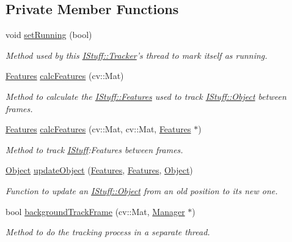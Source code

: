 \subsection*{Private Member Functions}
\begin{DoxyCompactItemize}
\item 
void \hyperlink{class_i_stuff_1_1_tracker_a0f512d1134b48840d65547bc60d2dd7d}{set\-Running} (bool)
\begin{DoxyCompactList}\small\item\em Method used by this \hyperlink{class_i_stuff_1_1_tracker}{I\-Stuff\-::\-Tracker}'s thread to mark itself as running. \end{DoxyCompactList}\item 
\hyperlink{namespace_i_stuff_a2d680b8d3ea1fa53d1aa740cc669063c}{Features} \hyperlink{class_i_stuff_1_1_tracker_ac36102855dfda592ccec02f77a8eaf35}{calc\-Features} (cv\-::\-Mat)
\begin{DoxyCompactList}\small\item\em Method to calculate the \hyperlink{namespace_i_stuff_a2d680b8d3ea1fa53d1aa740cc669063c}{I\-Stuff\-::\-Features} used to track \hyperlink{class_i_stuff_1_1_object}{I\-Stuff\-::\-Object} between frames. \end{DoxyCompactList}\item 
\hyperlink{namespace_i_stuff_a2d680b8d3ea1fa53d1aa740cc669063c}{Features} \hyperlink{class_i_stuff_1_1_tracker_afd3adb1eeef3d7337da0a3c9d9a152d2}{calc\-Features} (cv\-::\-Mat, cv\-::\-Mat, \hyperlink{namespace_i_stuff_a2d680b8d3ea1fa53d1aa740cc669063c}{Features} $\ast$)
\begin{DoxyCompactList}\small\item\em Method to track \hyperlink{namespace_i_stuff}{I\-Stuff}\-:Features between frames. \end{DoxyCompactList}\item 
\hyperlink{class_i_stuff_1_1_object}{Object} \hyperlink{class_i_stuff_1_1_tracker_a3d9b861a3cf475309dda610d68b5dbd5}{update\-Object} (\hyperlink{namespace_i_stuff_a2d680b8d3ea1fa53d1aa740cc669063c}{Features}, \hyperlink{namespace_i_stuff_a2d680b8d3ea1fa53d1aa740cc669063c}{Features}, \hyperlink{class_i_stuff_1_1_object}{Object})
\begin{DoxyCompactList}\small\item\em Function to update an \hyperlink{class_i_stuff_1_1_object}{I\-Stuff\-::\-Object} from an old position to its new one. \end{DoxyCompactList}\item 
bool \hyperlink{class_i_stuff_1_1_tracker_a26eecfd128d97776101938b59f13c987}{background\-Track\-Frame} (cv\-::\-Mat, \hyperlink{class_i_stuff_1_1_manager}{Manager} $\ast$)
\begin{DoxyCompactList}\small\item\em Method to do the tracking process in a separate thread. \end{DoxyCompactList}\end{DoxyCompactItemize}
